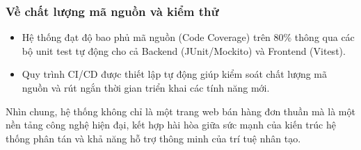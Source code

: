 \subsubsection{Về chất lượng mã nguồn và kiểm thử}
\begin{itemize}
    \item Hệ thống đạt độ bao phủ mã nguồn (Code Coverage) trên 80\% thông qua các bộ unit test tự động cho cả Backend (JUnit/Mockito) và Frontend (Vitest).
    \item Quy trình CI/CD được thiết lập tự động giúp kiểm soát chất lượng mã nguồn và rút ngắn thời gian triển khai các tính năng mới.
\end{itemize}

\vspace{10pt}
Nhìn chung, hệ thống không chỉ là một trang web bán hàng đơn thuần mà là một nền tảng công nghệ hiện đại, kết hợp hài hòa giữa sức mạnh của kiến trúc hệ thống phân tán và khả năng hỗ trợ thông minh của trí tuệ nhân tạo.
